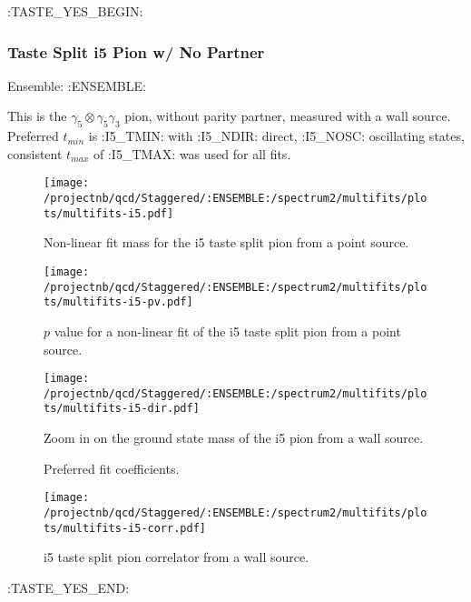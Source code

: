 \clearpage

:TASTE_YES_BEGIN:
\subsubsection{Taste Split i5 Pion w/ No Partner}

Ensemble: :ENSEMBLE:

This is the $\gamma_5 \otimes \gamma_5 \gamma_3$ pion, without parity partner, measured with a wall source. Preferred $t_{min}$ is :I5_TMIN: with :I5_NDIR: direct, :I5_NOSC: oscillating states, consistent $t_{max}$ of :I5_TMAX: was used for all fits.

\begin{multicols}{2}
\begin{figure}[H]
\centering
\texttt{[image: /projectnb/qcd/Staggered/:ENSEMBLE:/spectrum2/multifits/plots/multifits-i5.pdf]}
\caption{Non-linear fit mass for the i5 taste split pion from a point source.}
\end{figure}
\columnbreak
\begin{figure}[H]
\centering
\texttt{[image: /projectnb/qcd/Staggered/:ENSEMBLE:/spectrum2/multifits/plots/multifits-i5-pv.pdf]}
\caption{$p$ value for a non-linear fit of the i5 taste split pion from a point source.}
\end{figure}
\end{multicols}


\begin{figure}[H]
\centering
\texttt{[image: /projectnb/qcd/Staggered/:ENSEMBLE:/spectrum2/multifits/plots/multifits-i5-dir.pdf]}
\caption{Zoom in on the ground state mass of the i5 pion from a wall source.}
\end{figure}

\begin{multicols}{2}
\begin{figure}[H]
\centering
\scriptsize

\caption{Preferred fit coefficients.}
\end{figure}
\columnbreak
\begin{figure}[H]
\centering
\texttt{[image: /projectnb/qcd/Staggered/:ENSEMBLE:/spectrum2/multifits/plots/multifits-i5-corr.pdf]}
\caption{i5 taste split pion correlator from a wall source.}
\end{figure}
\end{multicols}

\clearpage
:TASTE_YES_END:

